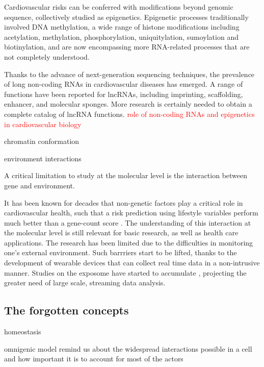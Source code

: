 \documentclass[letter]{bioinfo}
\newcommand{\comment}[1]{\textcolor{red}{#1}}
\begin{document}
Cardiovascular risks can be conferred with modifications beyond genomic sequence, collectively studied as epigenetics. Epigenetic processes traditionally involved DNA methylation, a wide range of histone modifications including acetylation, methylation, phosphorylation, uniquitylation, sumoylation and biotinylation, and are now encompassing more RNA-related processes that are not completely understood.

Thanks to the advance of next-generation sequencing techniques, the prevalence of long non-coding RNAs in cardiovascular diseases has emerged. A range of functions have been reported for lncRNAs, including imprinting, scaffolding, enhancer, and molecular sponges. More research is certainly needed to obtain a complete catalog of lncRNA functions. \comment{role of non-coding RNAs and epigenetics in cardiovascular biology \citep{Sallam:2018:Long}}

chromatin conformation \citep{Rosa-Garrido:2017:HighResolution}


environment interactions

A critical limitation to study at the molecular level is the interaction between gene  and environment.

It has been known for decades that non-genetic factors play a critical role in cardiovascular health, such that a risk prediction using lifestyle variables perform much better than a gene-count score \citep{Joyner:2011:Ten}. The understanding of this interaction at the molecular level is still relevant for basic research, as well as health care applications. The research has been limited due to the difficulties in monitoring one's external environment. Such barrriers start to be lifted, thanks to the development of wearable devices that can collect real time data in a non-intrusive manner. Studies on the exposome have started to accumulate \citep{Jiang:2018:Dynamic}, projecting the greater need of large scale, streaming data analysis.


\subsection{The forgotten concepts}

homeostasis

omnigenic model remind us about the widespread interactions possible in a cell and how important it is to account for most of the actors

\end{document}

